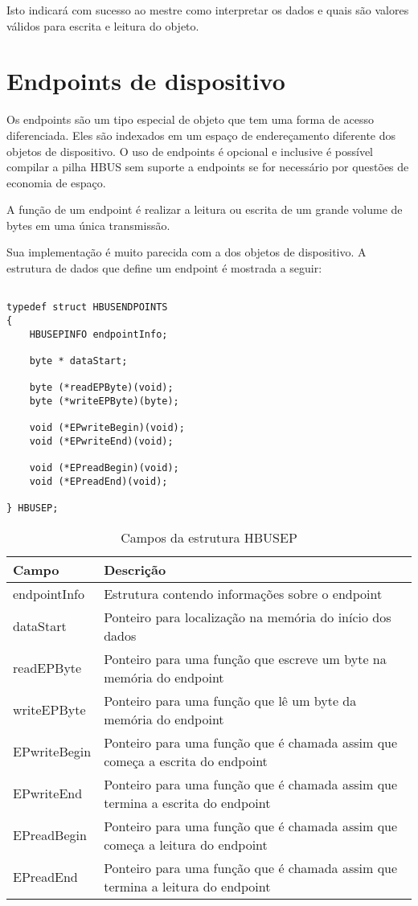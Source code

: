 Isto indicará com sucesso ao mestre como interpretar os dados e quais são valores válidos para escrita e leitura do objeto.

\section{Endpoints de dispositivo}

Os endpoints são um tipo especial de objeto que tem uma forma de acesso diferenciada. Eles são indexados em um espaço de endereçamento diferente dos objetos de dispositivo. O uso de endpoints é opcional e inclusive é possível compilar a pilha HBUS sem suporte a endpoints se for necessário por questões de economia de espaço.

A função de um endpoint é realizar a leitura ou escrita de um grande volume de bytes em uma única transmissão.

Sua implementação é muito parecida com a dos objetos de dispositivo. A estrutura de dados que define um endpoint é mostrada a seguir:

\begin{verbatim}

typedef struct HBUSENDPOINTS
{
	HBUSEPINFO endpointInfo;
	
	byte * dataStart;
	
	byte (*readEPByte)(void);
	byte (*writeEPByte)(byte);
	
	void (*EPwriteBegin)(void);
	void (*EPwriteEnd)(void);
	
	void (*EPreadBegin)(void);
	void (*EPreadEnd)(void);
	
} HBUSEP;

\end{verbatim}

\begin{table}[H]
\centering
\caption{Campos da estrutura HBUSEP}
\begin{tabular}{l p{12cm}}

\hline
Campo					&	Descrição\\
\hline
endpointInfo				&	Estrutura contendo informações sobre o endpoint\\
dataStart				&	Ponteiro para localização na memória do início dos dados\\
readEPByte				&	Ponteiro para uma função que escreve um byte na memória do endpoint\\
writeEPByte				&	Ponteiro para uma função que lê um byte da memória do endpoint\\
EPwriteBegin				&	Ponteiro para uma função que é chamada assim que começa a escrita do endpoint\\
EPwriteEnd				&	Ponteiro para uma função que é chamada assim que termina a escrita do endpoint\\
EPreadBegin				&	Ponteiro para uma função que é chamada assim que começa a leitura do endpoint\\
EPreadEnd				&	Ponteiro para uma função que é chamada assim que termina a leitura do endpoint\\
\hline

\end{tabular}
\end{table}

